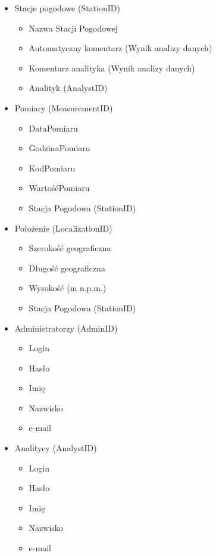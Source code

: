 \documentclass[12pt,a4paper]{article}
\begin{document}
\begin{footnotesize}
\begin{itemize}
\item Stacje pogodowe (StationID)
    \begin{itemize}
    \item Nazwa Stacji Pogodowej
    \item Automatyczny komentarz (Wynik analizy danych)
    \item Komentarz analityka (Wynik analizy danych)
    \item Analityk (AnalystID)
    \end{itemize}
\item Pomiary (MeasurementID)
    \begin{itemize}
    \item DataPomiaru
    \item GodzinaPomiaru
    \item KodPomiaru
    \item WartośćPomiaru
    \item Stacja Pogodowa (StationID)
    \end{itemize}
\item Położenie (LocalizationID)
	\begin{itemize}
	\item Szerokość geograficzna
    \item Długość geograficzna
    \item Wysokość (m n.p.m.)
    \item Stacja Pogodowa (StationID)
	\end{itemize}
\item Administratorzy (AdminID)
    \begin{itemize}
    \item Login
    \item Hasło
    \item Imię
    \item Nazwisko
    \item e-mail
    \end{itemize}
\item Analitycy (AnalystID)
    \begin{itemize}
    \item Login
    \item Hasło
    \item Imię
    \item Nazwisko
    \item e-mail
    \end{itemize}
\end{itemize}
\end{footnotesize}
\end{document}
